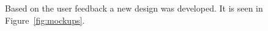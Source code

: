 Based on the user feedback a new design was developed. It is seen in Figure~\ref{fig:mockups}.
\begin{figure}%
\myfloatalign
{}
\end{figure}
